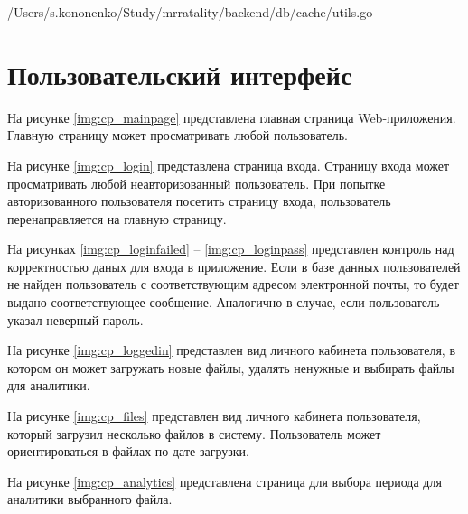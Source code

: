 \begin{lstinputlisting}[
	caption={Инициализация базы данных кэширования},
	label={lst:cachedb},
	style={go},
	linerange={13-56},
	]{/Users/s.kononenko/Study/mrratality/backend/db/cache/utils.go}
\end{lstinputlisting}

\section{Пользовательский интерфейс}

На рисунке \ref{img:cp_mainpage} представлена главная страница Web-приложения. Главную страницу может просматривать любой пользователь.


На рисунке \ref{img:cp_login} представлена страница входа. Страницу входа может просматривать любой неавторизованный пользователь. При попытке авторизованного пользователя посетить страницу входа, пользователь перенаправляется на главную страницу.


На рисунках \ref{img:cp_loginfailed} -- \ref{img:cp_loginpass} представлен контроль над корректностью даных для входа в приложение. Если в базе данных пользователей не найден пользователь с соответствующим адресом электронной почты, то будет выдано соответствующее сообщение. Аналогично в случае, если пользователь указал неверный пароль.



На рисунке \ref{img:cp_loggedin} представлен вид личного кабинета пользователя, в котором он может загружать новые файлы, удалять ненужные и выбирать файлы для аналитики.


На рисунке \ref{img:cp_files} представлен вид личного кабинета пользователя, который загрузил несколько файлов в систему. Пользователь может ориентироваться в файлах по дате загрузки.


На рисунке \ref{img:cp_analytics} представлена страница для выбора периода для аналитики выбранного файла.

